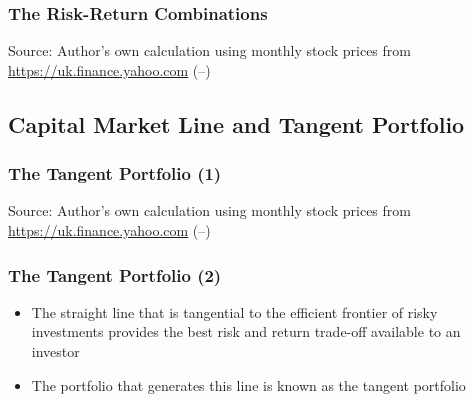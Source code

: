 \documentclass[9pt,aspectratio=169]{beamer}
\begin{document}
\begin{frame}

\frametitle{\textnormal{The Risk-Return Combinations}}

\begin{center}
    
    
    
    \tiny{Source: Author’s own calculation using monthly stock prices from \url{https://uk.finance.yahoo.com} (\LWindowFrom--\LWindowTo)}
\end{center}

\end{frame}

\subsection{Capital Market Line and Tangent Portfolio}


\begin{frame}

\frametitle{\textnormal{The Tangent Portfolio (1)}}

\begin{center}
    
    
    
    \tiny{Source: Author’s own calculation using monthly stock prices from \url{https://uk.finance.yahoo.com} (\LWindowFrom--\LWindowTo)}
\end{center}


\end{frame}

\begin{frame}

\frametitle{\textnormal{The Tangent Portfolio (2)}}

\begin{itemize}
    \item The straight line that is tangential to the efficient frontier of risky investments provides the best risk and return trade-off available to an investor
 \item The portfolio that generates this line is known as the tangent portfolio

\end{itemize}




\end{frame}
\end{document}
